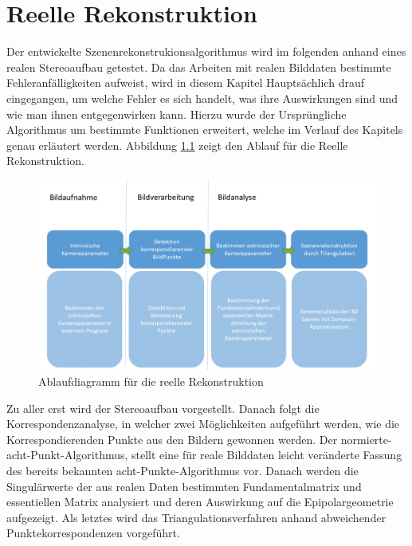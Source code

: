 \chapter{Reelle Rekonstruktion}
\label{sec:real} 

Der entwickelte Szenenrekonstrukionsalgorithmus wird im folgenden anhand eines realen Stereoaufbau getestet. Da das Arbeiten mit realen Bilddaten bestimmte Fehleranfälligkeiten aufweist, wird in diesem Kapitel Hauptsächlich drauf eingegangen, um welche Fehler es sich handelt, was ihre Auswirkungen sind und wie man ihnen entgegenwirken kann. Hierzu wurde der Ursprüngliche Algorithmus um bestimmte Funktionen erweitert, welche im Verlauf des Kapitels genau erläutert werden. Abbildung \ref{fig:ArbeitsProzessReell} zeigt den Ablauf für die Reelle Rekonstruktion. \\

\begin{figure}[!htb]
	\centering
	\includegraphics[width=1.\linewidth]{images/NEU_real_Arbeitsprozess.png}
	\caption[Ablaufdiagramm für die reelle Rekonstruktion]{Ablaufdiagramm für die reelle Rekonstruktion}
	\label{fig:ArbeitsProzessReell}
\end{figure}


Zu aller erst wird der Stereoaufbau vorgestellt. Danach folgt die Korrespondenzanalyse, in welcher zwei Möglichkeiten aufgeführt werden, wie die Korrespondierenden Punkte aus den Bildern gewonnen werden. Der normierte-acht-Punkt-Algorithmus, stellt eine für reale Bilddaten leicht veränderte Fassung des bereits bekannten acht-Punkte-Algorithmus vor. Danach werden die Singulärwerte der aus realen Daten bestimmten Fundamentalmatrix und essentiellen Matrix analysiert und deren Auswirkung auf die Epipolargeometrie aufgezeigt. Als letztes wird das Triangulationsverfahren anhand abweichender Punktekorrespondenzen vorgeführt.

